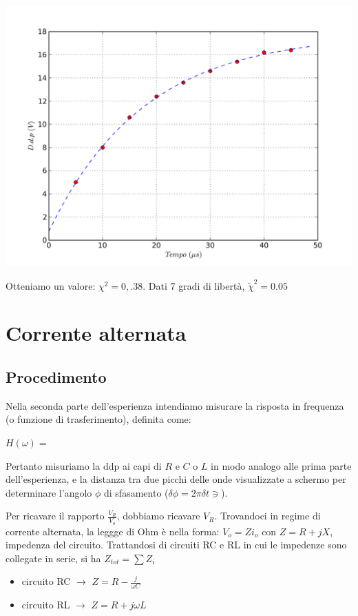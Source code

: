\begin{center}
 \includegraphics[scale=0.70]{grafici/C3/fitindu.png}
\end{center}

Otteniamo un valore: $\chi^2 = 0,.38 $. Dati 7 gradi di libertà, $\tilde{\chi}^2 = 0.05$



\section{Corrente alternata}
\subsection{Procedimento}
Nella seconda parte dell'esperienza intendiamo misurare la risposta in frequenza (o funzione di trasferimento), definita come:

$H\left(\omega \right) = $  


Pertanto misuriamo la ddp ai capi di $R$ e $C$ o $L$ in modo analogo alle prima parte dell'esperienza, e la distanza tra due picchi delle onde visualizzate a schermo per determinare l'angolo $\phi$ di sfasamento ($\delta \phi = 2 \pi \delta t \ni$).

Per ricavare il rapporto $\frac{V_{R}}{V_{o}}$, dobbiamo ricavare $V_R$. Trovandoci in regime di corrente alternata, la leggge di Ohm è nella forma: $ V_o = Zi_o$ con $Z = R + jX$, impedenza del circuito.
Trattandosi di circuiti RC e RL in cui le impedenze sono collegate in serie, si ha $Z_{tot} = \sum Z_i$

\begin{itemize}
\item circuito RC $\rightarrow$ $Z=R-\frac{j}{\omega C}$
\item circuito RL $\rightarrow$ $Z=R+j\omega L$
\end{itemize}  

